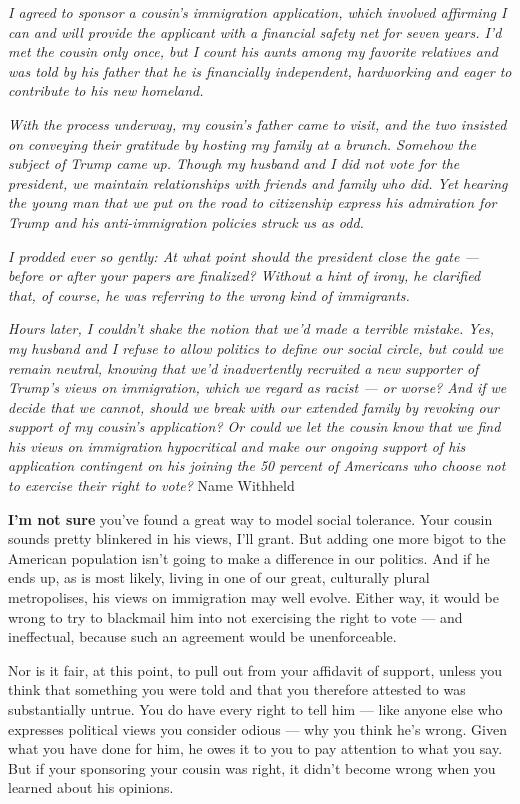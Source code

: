 \emph{I agreed to sponsor a cousin's immigration application, which
involved affirming I can and will provide the applicant with a financial
safety net for seven years. I'd met the cousin only once, but I count
his aunts among my favorite relatives and was told by his father that he
is financially independent, hardworking and eager to contribute to his
new homeland.}

\emph{With the process underway, my cousin's father came to visit, and
the two insisted on conveying their gratitude by hosting my family at a
brunch. Somehow the subject of Trump came up. Though my husband and I
did not vote for the president, we maintain relationships with friends
and family who did. Yet hearing the young man that we put on the road to
citizenship express his admiration for Trump and his anti-immigration
policies struck us as odd.}

\emph{I prodded ever so gently: At what point should the president close
the gate --- before or after your papers are finalized? Without a hint
of irony, he clarified that, of course, he was referring to the wrong
kind of immigrants.}

\emph{Hours later, I couldn't shake the notion that we'd made a terrible
mistake. Yes, my husband and I refuse to allow politics to define our
social circle, but could we remain neutral, knowing that we'd
inadvertently recruited a new supporter of Trump's views on immigration,
which we regard as racist --- or worse? And if we decide that we cannot,
should we break with our extended family by revoking our support of my
cousin's application? Or could we let the cousin know that we find his
views on immigration hypocritical and make our ongoing support of his
application contingent on his joining the 50 percent of Americans who
choose not to exercise their right to vote?} Name Withheld

\textbf{I'm not sure} you've found a great way to model social
tolerance. Your cousin sounds pretty blinkered in his views, I'll grant.
But adding one more bigot to the American population isn't going to make
a difference in our politics. And if he ends up, as is most likely,
living in one of our great, culturally plural metropolises, his views on
immigration may well evolve. Either way, it would be wrong to try to
blackmail him into not exercising the right to vote --- and ineffectual,
because such an agreement would be unenforceable.

Nor is it fair, at this point, to pull out from your affidavit of
support, unless you think that something you were told and that you
therefore attested to was substantially untrue. You do have every right
to tell him --- like anyone else who expresses political views you
consider odious --- why you think he's wrong. Given what you have done
for him, he owes it to you to pay attention to what you say. But if your
sponsoring your cousin was right, it didn't become wrong when you
learned about his opinions.


